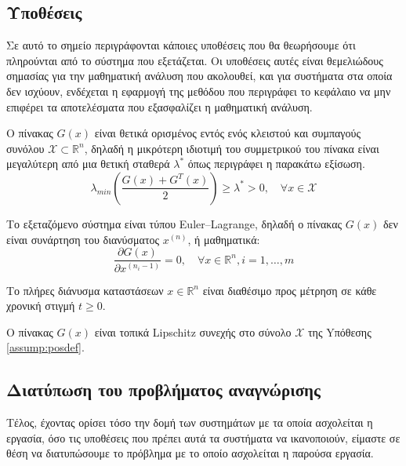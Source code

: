 \subsection{Υποθέσεις} \label{assumptions}
Σε αυτό το σημείο περιγράφονται κάποιες υποθέσεις που θα θεωρήσουμε ότι πληρούνται από το σύστημα που εξετάζεται. Οι υποθέσεις αυτές είναι θεμελιώδους σημασίας για την μαθηματική ανάλυση που ακολουθεί, και για συστήματα στα οποία δεν ισχύουν, ενδέχεται η εφαρμογή της μεθόδου που περιγράφει το κεφάλαιο να μην επιφέρει τα αποτελέσματα που εξασφαλίζει η μαθηματική ανάλυση.\\

\begin{assumption}
\label{assump:posdef}
Ο πίνακας $G(x)$ είναι θετικά ορισμένος εντός ενός κλειστού και συμπαγούς συνόλου $\mathcal{X} \subset \mathbb{R}^n$, δηλαδή η μικρότερη ιδιοτιμή του συμμετρικού του πίνακα είναι μεγαλύτερη από μια θετική σταθερά $\lambda^*$ όπως περιγράφει η παρακάτω εξίσωση.
\begin{equation}
	\lambda_{min} \left(\frac{G(x) + G^T (x)}{2}\right) \geq \lambda^* > 0
	,\quad \forall x \in \mathcal{X}
	\label{eq:assump_1}
\end{equation}
\end{assumption}

\begin{assumption}
Το εξεταζόμενο σύστημα είναι τύπου Euler–Lagrange, δηλαδή ο πίνακας $G(x)$ δεν είναι συνάρτηση του διανύσματος $x^{(n)}$, ή μαθηματικά:
\begin{equation}
	\frac{\partial G(x)}{\partial x^{(n_i-1)}} = 0, \quad \forall x \in \mathbb{R}^n, i = 1,\dots,m
	\label{eq:assump_2}
\end{equation}
\end{assumption}

\begin{assumption}
Το πλήρες διάνυσμα καταστάσεων $x \in \mathbb{R}^n$ είναι διαθέσιμο προς μέτρηση σε κάθε χρονική στιγμή $t \geq 0$.\newline
\end{assumption}

\begin{assumption} 
	Ο πίνακας $G(x)$ είναι τοπικά Lipschitz συνεχής στο σύνολο $\mathcal{X}$ της Yπόθεσης \ref{assump:posdef}.
\end{assumption}

\subsection{Διατύπωση του προβλήματος αναγνώρισης} \label{subsec:problem_definition}
Τέλος, έχοντας ορίσει τόσο την δομή των συστημάτων με τα οποία ασχολείται η εργασία, όσο τις υποθέσεις που πρέπει αυτά τα συστήματα να ικανοποιούν, είμαστε σε θέση να διατυπώσουμε το πρόβλημα με το οποίο ασχολείται η παρούσα εργασία.

